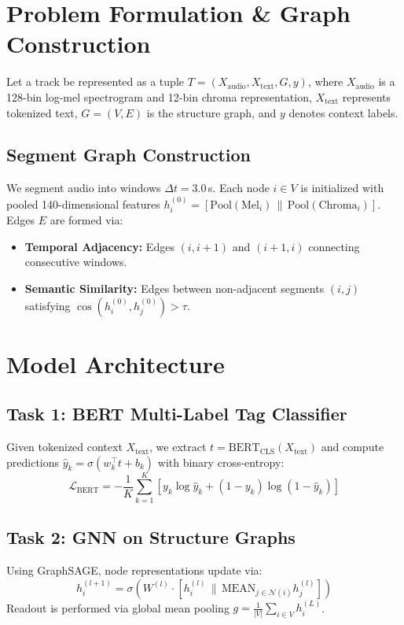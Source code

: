 \documentclass{article}
\begin{document}
\section{Problem Formulation \& Graph Construction}
Let a track be represented as a tuple $T = (X_{\text{audio}}, X_{\text{text}}, G, y)$, where $X_{\text{audio}}$ is a 128-bin log-mel spectrogram and 12-bin chroma representation, $X_{\text{text}}$ represents tokenized text, $G = (V, E)$ is the structure graph, and $y$ denotes context labels.

\subsection{Segment Graph Construction}
We segment audio into windows $\Delta t = 3.0$\,s. Each node $i \in V$ is initialized with pooled 140-dimensional features $h_i^{(0)} = [\text{Pool}(\text{Mel}_i) \,\|\, \text{Pool}(\text{Chroma}_i)]$. Edges $E$ are formed via:
\begin{itemize}
    \item \textbf{Temporal Adjacency:} Edges $(i, i+1)$ and $(i+1, i)$ connecting consecutive windows.
    \item \textbf{Semantic Similarity:} Edges between non-adjacent segments $(i, j)$ satisfying $\cos(h_i^{(0)}, h_j^{(0)}) > \tau$.
\end{itemize}

\section{Model Architecture}
\subsection{Task 1: BERT Multi-Label Tag Classifier}
Given tokenized context $X_{\text{text}}$, we extract $t = \text{BERT}_{\text{CLS}}(X_{\text{text}})$ and compute predictions $\hat{y}_k = \sigma(w_k^\top t + b_k)$ with binary cross-entropy:
\begin{equation}
\mathcal{L}_{\text{BERT}} = -\frac{1}{K}\sum_{k=1}^K [y_k \log \hat{y}_k + (1 - y_k)\log(1 - \hat{y}_k)]
\end{equation}

\subsection{Task 2: GNN on Structure Graphs}
Using GraphSAGE, node representations update via:
\begin{equation}
h_i^{(l+1)} = \sigma\left( W^{(l)} \cdot [h_i^{(l)} \,\|\, \text{MEAN}_{j \in \mathcal{N}(i)} h_j^{(l)}] \right)
\end{equation}
Readout is performed via global mean pooling $g = \frac{1}{|V|} \sum_{i \in V} h_i^{(L)}$.
\end{document}
